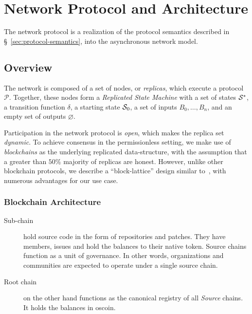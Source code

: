 \section{Network Protocol and Architecture}

The \oscoin{} network protocol is a realization of the protocol semantics
described in \S~\ref{sec:protocol-semantics}, into the asynchronous network
model.

\subsection{Overview}


The \oscoin{} network is composed of a set of nodes, or \emph{replicas}, which
execute a protocol $\mathcal{P}$. Together, these nodes form a \emph{Replicated
State Machine} with a set of states $\mathcal{S}^*$, a transition function $\delta$,
a starting state $\mathcal{S}_0$, a set of inputs $B_0,\dots,B_n$, and an empty set
of outputs $\varnothing$.

Participation in the network protocol is \emph{open}, which makes the replica
set \emph{dynamic}. To achieve consensus in the permissionless setting, we make
use of \emph{blockchains} as the underlying replicated data-structure, with the
assumption that a greater than $50\%$ majority of replicas are honest.
However, unlike other blockchain protocols, we describe a ``block-lattice''
design similar to~\cite{raiblocks}, with numerous advantages for our use case.

\subsubsection{Blockchain Architecture}


\begin{description}
    \item[Sub-chain] hold source code in the form of repositories and
        patches.  They have members, issues and hold the balances to their
        native token.  Source chains function as a unit of governance.  In
        other words, organizations and communities are expected to operate
        under a single source chain.
    \item[Root chain] on the other hand functions as the canonical registry
        of all \emph{Source} chains. It holds the balances in oscoin.
\end{description}

